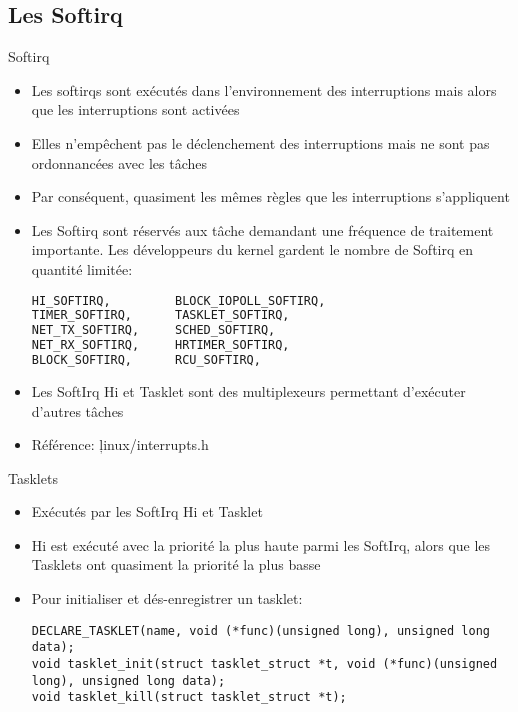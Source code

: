 \subsection{Les Softirq}

\begin{frame}[fragile=singleslide]{Softirq}
  \begin{itemize} 
  \item   Les  softirqs   sont  exécutés   dans   l'environnement  des
    interruptions mais alors que les interruptions sont activées
  \item Elles  n'empêchent pas le déclenchement  des interruptions mais
    ne sont pas ordonnancées avec les tâches
  \item   Par  conséquent,   quasiment  les   mêmes  règles   que  les
    interruptions s'appliquent
  \item Les Softirq sont réservés aux tâche demandant une fréquence de
    traitement  importante.  Les  développeurs  du kernel  gardent  le
    nombre de Softirq en quantité limitée:
    \begin{lstlisting}[language=sh]
HI_SOFTIRQ,         BLOCK_IOPOLL_SOFTIRQ,
TIMER_SOFTIRQ,      TASKLET_SOFTIRQ,
NET_TX_SOFTIRQ,     SCHED_SOFTIRQ,
NET_RX_SOFTIRQ,     HRTIMER_SOFTIRQ,
BLOCK_SOFTIRQ,      RCU_SOFTIRQ,
    \end{lstlisting} 
  \item Les SoftIrq Hi et Tasklet sont des multiplexeurs permettant
    d'exécuter d'autres tâches
  \item Référence: \c{linux/interrupts.h}
  \end{itemize} 
\end{frame}

\begin{frame}[fragile=singleslide]{Tasklets}
  \begin{itemize} 
  \item Exécutés par les SoftIrq Hi et Tasklet
  \item  Hi est  exécuté  avec la  priorité  la plus  haute parmi  les
    SoftIrq, alors que les Tasklets ont quasiment la priorité la plus
    basse
  \item Pour initialiser et dés-enregistrer un tasklet:
    \begin{lstlisting} 
DECLARE_TASKLET(name, void (*func)(unsigned long), unsigned long data);
void tasklet_init(struct tasklet_struct *t, void (*func)(unsigned long), unsigned long data);
void tasklet_kill(struct tasklet_struct *t);
    \end{lstlisting} 
  \end{itemize}
\end{frame}


